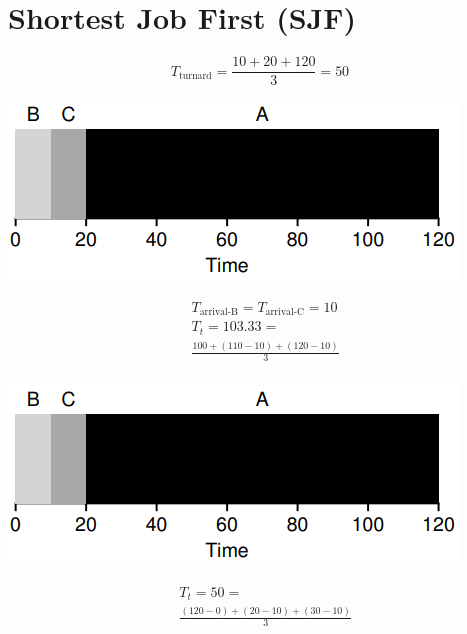 \begin{minipage}{.5\linewidth}
\section*{Shortest Job First (SJF)}
\begin{equation*}
  T_{\text{turnard}} = \frac{10+20+120}{3} = 50
\end{equation*}
\end{minipage}
\begin{minipage}{.5\linewidth}
  \includegraphics[width=\linewidth]{imgs/sched_fifo3}
\end{minipage}
\begin{minipage}{.5\linewidth}
  \begin{align*}
    & T_{\text{arrival-B}} = T_{\text{arrival-C}} = 10 \\
    & T_{t} = 103.33 = \\
    &\frac{100+(110-10)+(120-10)}{3} \\
  \end{align*}
\end{minipage}
\begin{minipage}{.5\linewidth}
  \includegraphics[width=\linewidth]{imgs/sched_fifo3}
\end{minipage}
\begin{minipage}{.5\linewidth}
  \begin{align*}
    & T_{t} = 50 = \\
    & \frac{(120-0)+(20-10)+(30-10)}{3} \\
  \end{align*}
\end{minipage}
